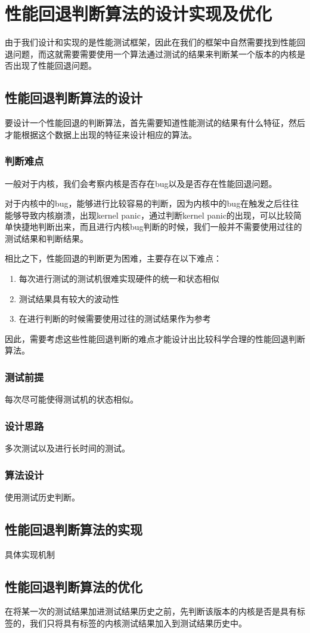 

\chapter{性能回退判断算法的设计实现及优化}
由于我们设计和实现的是性能测试框架，因此在我们的框架中自然需要找到性能回退问题，而这就需要需要使用一个算法通过测试的结果来判断某一个版本的内核是否出现了性能回退问题。


\section{性能回退判断算法的设计}
要设计一个性能回退的判断算法，首先需要知道性能测试的结果有什么特征，然后才能根据这个数据上出现的特征来设计相应的算法。

\subsection{判断难点}
一般对于内核，我们会考察内核是否存在bug以及是否存在性能回退问题。

对于内核中的bug，能够进行比较容易的判断，因为内核中的bug在触发之后往往能够导致内核崩溃，出现kernel panic，通过判断kernel panic的出现，可以比较简单快捷地判断出来，而且进行内核bug判断的时候，我们一般并不需要使用过往的测试结果和判断结果。

相比之下，性能回退的判断更为困难，主要存在以下难点：
\begin{enumerate}
\item 每次进行测试的测试机很难实现硬件的统一和状态相似
\item 测试结果具有较大的波动性
\item 在进行判断的时候需要使用过往的测试结果作为参考
\end{enumerate}

因此，需要考虑这些性能回退判断的难点才能设计出比较科学合理的性能回退判断算法。
\subsection{测试前提}
每次尽可能使得测试机的状态相似。
\subsection{设计思路}
多次测试以及进行长时间的测试。
\subsection{算法设计}
使用测试历史判断。
\section{性能回退判断算法的实现}
具体实现机制

\section{性能回退判断算法的优化}
在将某一次的测试结果加进测试结果历史之前，先判断该版本的内核是否是具有标签的，我们只将具有标签的内核测试结果加入到测试结果历史中。